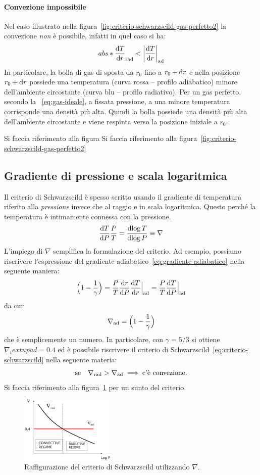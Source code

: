 \paragraph{Convezione impossibile}
Nel caso illustrato nella figura~\ref{fig:criterio-schwarzscild-gas-perfetto2} la convezione \emph{non} è possibile, infatti in quel caso si ha:
\[
abs*{\dfrac{\ud T}{\ud r}}_\textup{rad} < \abs*{\dfrac{\ud T}{\ud r}}_\textup{ad}
\]
In particolare, la bolla di gas di sposta da $r_0$ fino a $r_0 + \ud r$ e nella posizione $r_0 + \ud r$ possiede una temperatura (curva rossa -- profilo adiabatico) minore dell'ambiente circostante (curva blu -- profilo radiativo). Per un gas perfetto, secondo la ~\eqref{eq:gas-ideale}, a fissata pressione, a una minore temperatura corrisponde una densità più alta. Quindi la bolla possiede una densità più alta dell'ambiente circostante e viene respinta verso la posizione iniziale a $r_0$.


Si faccia riferimento alla figura
Si faccia riferimento alla figura~\ref{fig:criterio-schwarzscild-gas-perfetto2}

\subsection{Gradiente di pressione e scala logaritmica}
Il criterio di Schwarzscild è spesso scritto usando il gradiente di temperatura riferito alla \emph{pressione} invece che al raggio e in scala logaritmica. Questo perché la temperatura è intimamente connessa con la pressione.
\begin{equation}
    \dfrac{\ud T}{\ud P} \dfrac{P}{T} = \dfrac{\ud \log T}{\ud \log P} \equiv \nabla
\end{equation}
L'impiego di $\nabla$ semplifica la formulazione del criterio. Ad esempio, possiamo riscrivere l'espressione del gradiente adiabatico~\eqref{eq:gradiente-adiabatico} nella seguente maniera:
\[
\Bigl(1- \frac{1}{\gamma}\Bigr) = \dfrac{P}{T} \dfrac{\ud r}{\ud P} \dfrac{\ud T}{\ud r}\Big|_\textup{ad} = \dfrac{P}{T} \dfrac{\ud T}{\ud P}\Big|_\textup{ad}
\]
da cui:
\begin{equation}
    \nabla_\textup{ad} = \Bigl(1- \frac{1}{\gamma}\Bigr)
\end{equation}
che è semplicemente un numero. In particolare, con $\gamma = 5/3$ si ottiene $\nabla_textup{ad} = 0.4$ ed è possibile riscrivere il criterio di Schwarzscild~\eqref{eq:criterio-schwarzscild} nella seguente materia:
\begin{equation}\label{eq:criterio-schwarzscild-nabla}
    \text{se} \quad \nabla_\textup{rad} > \nabla_\textup{ad} \implies \text{c'è convezione.}
\end{equation}
Si faccia riferimento alla figura~\ref{fig:criterio-schwarzscild-nabla} per un sunto del criterio.

\begin{figure}
\centering
\includegraphics[width=0.4\textwidth]{immagini/criterio-schwarzscild-nabla.png}
\caption{Raffigurazione del criterio di Schwarzscild utilizzando $\nabla$.}
\label{fig:criterio-schwarzscild-nabla}
\end{figure}
